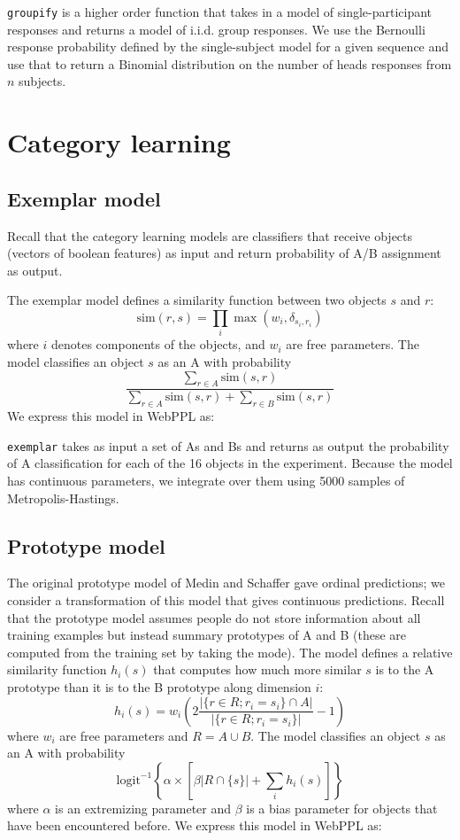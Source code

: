 \documentclass{article}
\begin{document}
\lstinline{groupify} is a higher order function that takes in a model of single-participant responses and returns a model of i.i.d. group responses.
We use the Bernoulli response probability defined by the single-subject model for a given sequence and use that to return a Binomial distribution on the number of heads responses from $n$ subjects.

\section{Category learning}

\subsection{Exemplar model}

Recall that the category learning models are classifiers that receive objects (vectors of boolean features) as input and return probability of A/B assignment as output.

The exemplar model defines a similarity function between two objects $s$ and $r$:
$$ \text{sim}(r, s) = \prod_i{\max(w_i, \delta_{s_i,r_i})  }$$
where $i$ denotes components of the objects, and $w_i$ are free parameters.
The model classifies an object $s$ as an A with probability
$$ \frac{ \sum\limits_{r \in A}{\text{sim}(s,r)}}{
\sum\limits_{r \in A}{\text{sim}(s,r)} +
\sum\limits_{r \in B}{\text{sim}(s,r)}
 }$$
We express this model in WebPPL as:


\lstinline{exemplar} takes as input a set of As and Bs and returns as output the probability of A classification for each of the 16 objects in the experiment.
Because the model has continuous parameters, we integrate over them using 5000 samples of Metropolis-Hastings.

\subsection{Prototype model}

The original prototype model of Medin and Schaffer gave ordinal predictions; we consider a transformation of this model that gives continuous predictions.
Recall that the prototype model assumes people do not store information about all training examples but instead summary prototypes of A and B (these are computed from the training set by taking the mode).
The model defines a relative similarity function $h_i(s)$ that computes how much more similar $s$ is to the A prototype than it is to the B prototype along dimension $i$:
$$ h_i(s) =  w_i\left(2\frac{|\{r \in R ; r_i = s_i \} \cap A |}{|\{r \in R ; r_i = s_i \}|} - 1\right)$$
where $w_i$ are free parameters and $R = A \cup B$.
The model classifies an object $s$ as an A with probability
$$ \mathrm{logit}^{-1}\left\{ \alpha \times \left[ \beta |R \cap \{s\}| + \sum\limits_{i}{h_i(s)} \right] \right\}$$
where $\alpha$ is an extremizing parameter and $\beta$ is a bias parameter for objects that have been encountered before. We express this model in WebPPL as:

\end{document}
